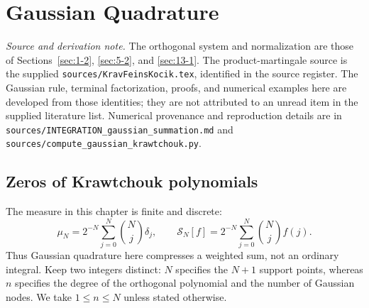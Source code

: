 \chapter{Gaussian Quadrature}
\label{ch:17}
\noindent\emph{Source and derivation note.}
The orthogonal system and normalization are those of Sections~\ref{sec:1-2}, \ref{sec:5-2}, and \ref{sec:13-1}. The product-martingale source is the supplied \texttt{sources/KravFeinsKocik.tex}, identified in the source register. The Gaussian rule, terminal factorization, proofs, and numerical examples here are developed from those identities; they are not attributed to an unread item in the supplied literature list. Numerical provenance and reproduction details are in \texttt{sources/INTEGRATION\_gaussian\_summation.md} and \texttt{sources/compute\_gaussian\_krawtchouk.py}.

\section{Zeros of Krawtchouk polynomials}
\label{sec:17-1}
The measure in this chapter is finite and discrete:
\[
\mu_N=2^{-N}\sum_{j=0}^N\binom Nj\delta_j,\qquad
\mathcal S_N[f]=2^{-N}\sum_{j=0}^N\binom Nj f(j).
\]
Thus Gaussian quadrature here compresses a weighted sum, not an ordinary integral. Keep two integers distinct: $N$ specifies the $N+1$ support points, whereas $n$ specifies the degree of the orthogonal polynomial and the number of Gaussian nodes. We take $1\le n\le N$ unless stated otherwise.

